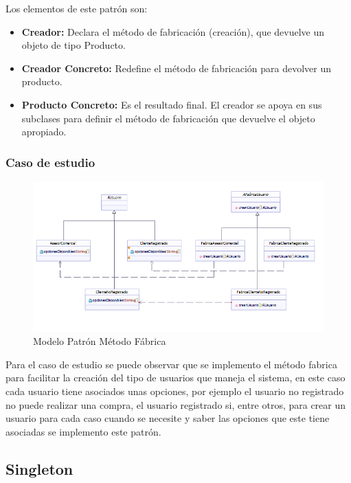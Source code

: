 Los elementos de este patrón son:
\begin{itemize}
	\item \textbf{Creador: }Declara el método de fabricación (creación), que devuelve un objeto de tipo Producto.
	\item \textbf{Creador Concreto: }Redefine el método de fabricación para devolver un producto.
	\item \textbf{Producto Concreto: }Es el resultado final. El creador se apoya en sus subclases para definir el método de fabricación que devuelve el objeto apropiado.
\end{itemize}


\subsubsection{Caso de estudio}
\begin{figure}[h!]
	\centering
	\includegraphics[width=0.7\linewidth]{arquitectura/imagenes/DiagramaMetodoFabrica}
	\caption{Modelo Patrón Método Fábrica}
\end{figure}

Para el caso de estudio se puede observar que se implemento el método fabrica para facilitar la creación del tipo de usuarios que maneja el sistema, en este caso cada usuario tiene asociados unas opciones, por ejemplo el usuario no registrado no puede realizar una compra, el usuario registrado si, entre otros, para crear un usuario para cada caso cuando se necesite y saber las opciones que este tiene asociadas se implemento este patrón.

\subsection{Singleton}
